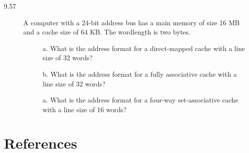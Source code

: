 \documentclass[letterpaper,10pt,titlepage]{article}
\begin{document}
\begin{description}
    
    \item[9.57]A computer with a 24-bit address bus has a main memory of size 16 MB and a cache size of 64 KB. The wordlength is two bytes.
    \begin{description}
	    \item[] a. What is the address format for a direct-mapped cache with a line size of 32 words?
	    \item[] b. What is the address format for a fully associative cache with a line size of 32 words?
	    \item[] a. What is the address format for a four-way set-associative cache with a line size of 16 words?
    \end{description}
\end{description}

\newpage
\section*{References}
\end{document}
